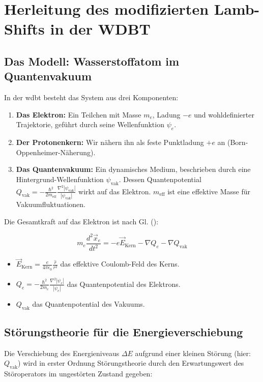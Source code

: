 \chapter{Herleitung des modifizierten Lamb-Shifts in der WDBT}
\label{att:lamb_shift}

\section{Das Modell: Wasserstoffatom im Quantenvakuum}
In der \gls{wdbt} besteht das System aus drei Komponenten:

\begin{enumerate}
    \item \textbf{Das Elektron:} Ein Teilchen mit Masse $m_e$, Ladung $-e$ und wohldefinierter Trajektorie, geführt durch seine Wellenfunktion $\psi_e$.
    \item \textbf{Der Protonenkern:} Wir nähern ihn als feste Punktladung $+e$ an (Born-Oppenheimer-Näherung).
    \item \textbf{Das Quantenvakuum:} Ein dynamisches Medium, beschrieben durch eine Hintergrund-Wellenfunktion $\psi_\text{vak}$. Dessen Quantenpotential $Q_{\text{vak}} = -\frac{\hbar^2}{2m_{\text{eff}}} \frac{\nabla^2 \left|{\psi_{\text{vak}}}\right|}{\left|{\psi_{\text{vak}}}\right|}$ wirkt auf das Elektron. $m_\text{eff}$ ist eine effektive Masse für Vakuumfluktuationen.
\end{enumerate}

Die Gesamtkraft auf das Elektron ist nach Gl. ():

\begin{equation}
    m_e \frac{d^2\vec{x}_e}{dt^2} = -e\vec{E}_{\text{Kern}} - \nabla Q_e - \nabla Q_{\text{vak}}
\end{equation}

\begin{itemize}
    \item $\vec{E}_{\text{Kern}} = \frac{e}{4\pi\epsilon_0} \frac{\hat{r}}{r^2}$ das effektive Coulomb-Feld des Kerns.
    \item $Q_e = -\frac{\hbar^2}{2m_e} \frac{\nabla^2 |\psi_e|}{|\psi_e|}$ das Quantenpotential des Elektrons.
    \item $Q_\text{vak}$ das Quantenpotential des Vakuums.
\end{itemize}

\section{Störungstheorie für die Energieverschiebung}
Die Verschiebung des Energieniveaus $\Delta E$ aufgrund einer kleinen Störung (hier: $Q_\text{vak}$) wird in erster Ordnung Störungstheorie durch den Erwartungswert des Störoperators im ungestörten
Zustand gegeben:

